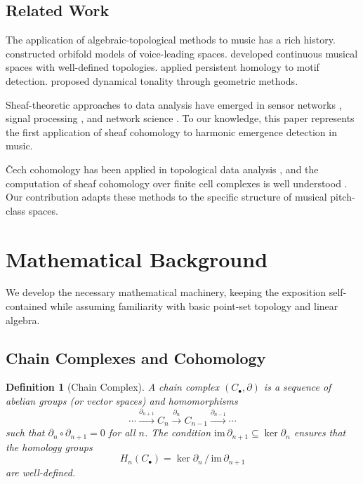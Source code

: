 \documentclass[12pt,a4paper]{article}
\newtheorem{definition}[theorem]{Definition}
\begin{document}
\subsection{Related Work}

The application of algebraic-topological methods to music has a rich history. 
\citet{tymoczko2011} constructed orbifold models of voice-leading spaces. 
\citet{callender2008} developed continuous musical spaces with well-defined topologies. 
\citet{musicatnavas2018} applied persistent homology to motif detection. 
\citet{bergomi2015} proposed dynamical tonality through geometric methods.

Sheaf-theoretic approaches to data analysis have emerged in sensor networks 
\cite{sheafsensor2012}, signal processing \cite{sheafsignal2016}, and network science 
\cite{sheafnetwork2019}. To our knowledge, this paper represents the first application 
of sheaf cohomology to harmonic emergence detection in music.

\v{C}ech cohomology has been applied in topological data analysis \cite{tdacech2014}, 
and the computation of sheaf cohomology over finite cell complexes is well understood 
\cite{shepard1982,curry2014}. Our contribution adapts these methods to the specific 
structure of musical pitch-class spaces.

\section{Mathematical Background}\label{sec:background}

We develop the necessary mathematical machinery, keeping the exposition self-contained 
while assuming familiarity with basic point-set topology and linear algebra.

\subsection{Chain Complexes and Cohomology}

\begin{definition}[Chain Complex]
  A \emph{chain complex} $(C_{\bullet}, \partial)$ is a sequence of abelian groups 
  (or vector spaces) and homomorphisms
  \[
    \cdots \xrightarrow{\partial_{n+1}} C_n \xrightarrow{\partial_n} C_{n-1} 
    \xrightarrow{\partial_{n-1}} \cdots
  \]
  such that $\partial_{n} \circ \partial_{n+1} = 0$ for all $n$. The condition 
  $\mathrm{im}\, \partial_{n+1} \subseteq \ker \partial_n$ ensures that the 
  \emph{homology groups}
  \[
    H_n(C_{\bullet}) = \ker \partial_n \,/\, \mathrm{im}\, \partial_{n+1}
  \]
  are well-defined.
\end{definition}
\end{document}
